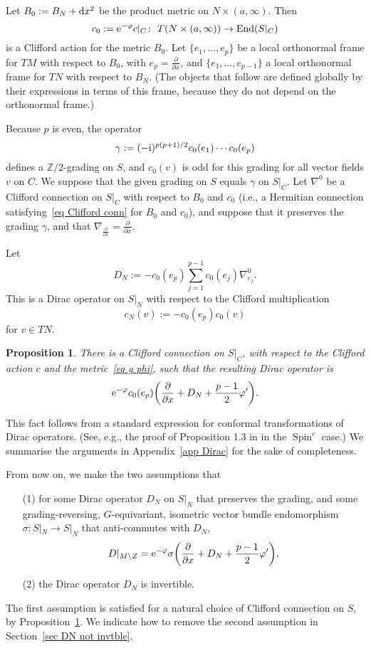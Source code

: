 \documentclass[pdftex]{sigma}%
\numberwithin{equation}{section}
\newtheorem{Proposition}[Theorem]{Proposition}
 { \theoremstyle{definition}
\newtheorem{Definition}[Theorem]{Definition}
\newtheorem{Note}[Theorem]{Note}
\newtheorem{Example}[Theorem]{Example}
\newtheorem{Remark}[Theorem]{Remark} }
\DeclareMathOperator{\End}{End}
\DeclareMathOperator{\Spin}{Spin}
\newcommand{\Spinc}{\Spin^c}
\newcommand{\Z}{\mathbb{Z}}
\begin{document}
Let $B_0 := B_N + {\rm d}x^2$ be the product metric on $N \times (a,\infty)$.
Then
\[
c_0:= {\rm e}^{-\varphi} c|_{C}\colon\ T(N \times (a,\infty)) \to \End(S|_{C})
\]
is a Clifford action for the metric $B_0$. Let $\{e_1,\dots, e_p\}$ be a local orthonormal frame for $TM$ with respect to $B_0$, with $e_p = \frac{\partial}{\partial x}$, and $\{e_1,\dots, e_{p-1}\}$ a local orthonormal frame for $TN$ with respect to $B_N$. (The objects that follow are defined globally by their expressions in terms of this frame, because they do not depend on the orthonormal frame.)

Because $p$ is even, the operator
\[
\gamma := (-{\rm i})^{p(p+1)/2} c_0(e_1) \cdots c_0(e_p)
\]
defines a $\Z/2$-grading
on $S$, and $c_0(v)$ is odd for this grading for all vector fields $v$ on $C$. We suppose that the given grading on $S$ equals $\gamma$ on $S|_C$.
Let $\nabla^0$ be a Clifford connection on $S|_C$ with respect to $B_0$ and $c_0$ (i.e., a Hermitian connection satisfying~\eqref{eq Clifford conn} for $B_0$ and $c_0$), and suppose that it preserves the grading $\gamma$, and that $\nabla_{\frac{\partial}{\partial x}} = \frac{\partial}{\partial x}$.

Let
\[
D_N := -c_0(e_p) \sum_{j=1}^{p-1}c_0(e_j) \nabla^0_{e_j}.
\]
This is a Dirac operator on $S|_N$ with respect to the Clifford multiplication
\[
c_N(v) := -c_0(e_p)c_0(v)
\]
for $v \in TN$.

\begin{Proposition}\label{prop Dphi}
There is a Clifford connection on $S|_C$, with respect to the Clifford action $c$ and the metric~\eqref{eq g phi},
 such that the resulting Dirac operator is
\begin{equation} \label{eq Dphi}
{\rm e}^{-\varphi} c_0(e_p)\bigg(\frac{\partial}{\partial x}+D_N +\frac{p-1}{2}\varphi' \bigg).
\end{equation}
\end{Proposition}

This fact follows from a standard expression for conformal transformations of Dirac operators. (See, e.g., the proof of Proposition 1.3 in \cite{Hitchin74} in the $\Spinc$ case.) We summarise the arguments in Appendix~\ref{app Dirac} for the sake of completeness.

From now on, we make the two assumptions that
\begin{enumerate}\itemsep=0pt
\item[(1)] for some Dirac operator $D_N$ on $S|_N$ that preserves the grading, and some grading-reversing, $G$-equivariant, isometric vector bundle endomorphism $\sigma\colon S|_N \to S|_N$ that anti-commutes with $D_N$,
\begin{equation} \label{eq DC Dphi}
 D|_{M \setminus Z} = {\rm e}^{-\varphi} \sigma \bigg(\frac{\partial}{\partial x}+D_N +\frac{p-1}{2}\varphi' \bigg),
 \end{equation}
 \item[(2)] the Dirac operator $D_N$ is invertible.
\end{enumerate}
The first assumption is satisfied for a natural choice of Clifford connection on $S$, by Proposition~\ref{prop Dphi}. We indicate how to remove the second assumption in Section~\ref{sec DN not invtble}.
\end{document}
